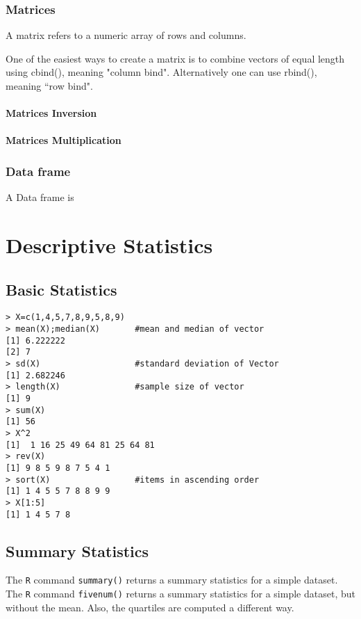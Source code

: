 \documentclass[a4paper,12pt]{article}
\begin{document}
\begin{itemize}
\subsection{Matrices}
A matrix refers to a numeric array of rows and columns.

One of the easiest ways to create a matrix is to combine vectors of equal
length using cbind(), meaning "column bind". Alternatively one can use rbind(), meaning ``row bind".


\subsubsection{Matrices Inversion}
\subsubsection{Matrices Multiplication}


\subsection{Data frame}
A Data frame is
\newpage


\chapter{Descriptive Statistics}

\section{Basic Statistics}

\footnotesize
\begin{myindentpar}{1cm}
\begin{verbatim}
> X=c(1,4,5,7,8,9,5,8,9)
> mean(X);median(X)       #mean and median of vector
[1] 6.222222
[2] 7
> sd(X)                   #standard deviation of Vector
[1] 2.682246
> length(X)               #sample size of vector
[1] 9
> sum(X)
[1] 56
> X^2
[1]  1 16 25 49 64 81 25 64 81
> rev(X)
[1] 9 8 5 9 8 7 5 4 1
> sort(X)                 #items in ascending order
[1] 1 4 5 5 7 8 8 9 9
> X[1:5]
[1] 1 4 5 7 8
\end{verbatim}
\end{myindentpar}
\normalsize


\section{Summary Statistics}
The \texttt{R} command \texttt{summary()} returns a summary statistics for a simple dataset.
The \texttt{R} command \texttt{fivenum()} returns a summary statistics for a simple dataset, but without the mean.
Also, the quartiles are computed a different way.


\end{itemize}
\end{document}
